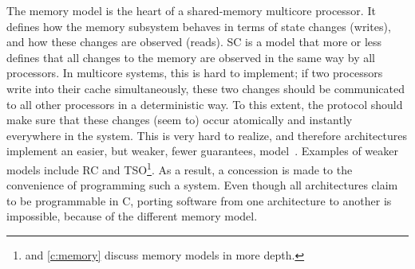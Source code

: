 
The memory model is the heart of a shared-memory multicore processor.
It defines how the memory subsystem behaves in terms of state changes (writes), and how these changes are observed (reads).
\Acl{SC} is a model that more or less defines that all changes to the memory are observed in the same way by all processors.
In multicore systems, this is hard to implement; if two processors write into their cache simultaneously, these two changes should be communicated to all other processors in a deterministic way.
To this extent, the  protocol should make sure that these changes (seem to) occur atomically and instantly everywhere in the system.
This is very hard to realize, and therefore architectures implement an easier, but weaker, \ie fewer guarantees, model~\cite{blake:multiproc_survey,choi:denovo}.
Examples of weaker models include \acl{RC} and \ac{TSO}\footnote{%
	 and \cref{c:memory} discuss memory models in more depth.}.
As a result, a concession is made to the convenience of programming such a system.
Even though all architectures claim to be programmable in C, porting software from one architecture to another is impossible, because of the different memory model.


